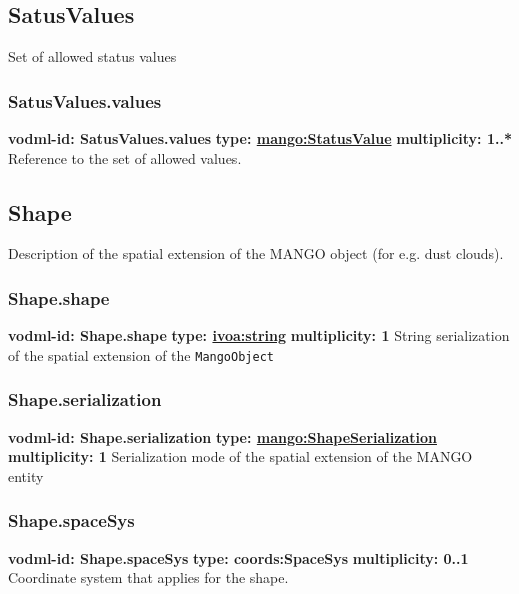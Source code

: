   \subsection{SatusValues}
  \label{sect:SatusValues}
    Set of allowed status values

    \subsubsection{SatusValues.values}
      \textbf{vodml-id: SatusValues.values} \newline
      \textbf{type: \hyperref[sect:StatusValue]{mango:StatusValue}} \newline
      \textbf{multiplicity: 1..*} \newline 
      Reference to the set of allowed values.

  \subsection{Shape}
  \label{sect:Shape}
    Description of the spatial extension of the MANGO object (for e.g. dust clouds).

    \subsubsection{Shape.shape}
      \textbf{vodml-id: Shape.shape} \newline
      \textbf{type: \hyperref[sect:ivoa]{ivoa:string}} \newline
      \textbf{multiplicity: 1} \newline 
      String serialization of the spatial extension of the \texttt{MangoObject}

    \subsubsection{Shape.serialization}
      \textbf{vodml-id: Shape.serialization} \newline
      \textbf{type: \hyperref[sect:ShapeSerialization]{mango:ShapeSerialization}} \newline
      \textbf{multiplicity: 1} \newline 
      Serialization mode of the spatial extension of the MANGO entity

    \subsubsection{Shape.spaceSys}
      \textbf{vodml-id: Shape.spaceSys} \newline
      \textbf{type: coords:SpaceSys} \newline
      \textbf{multiplicity: 0..1} \newline 
      Coordinate system that applies for the shape.

